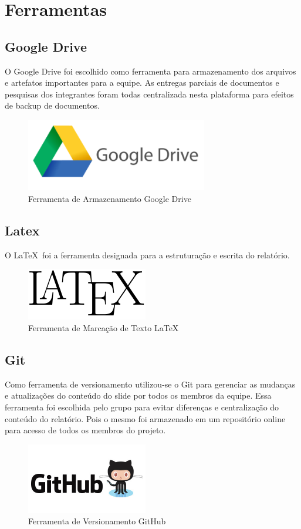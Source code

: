 \section{Ferramentas}

\subsection{Google Drive}
O Google Drive foi escolhido como ferramenta para armazenamento dos arquivos e artefatos importantes para a
equipe. As entregas parciais de documentos e pesquisas dos integrantes foram todas centralizada nesta plataforma
para efeitos de backup de documentos.
\begin{figure}[h]
  \centering
  \includegraphics[width=300px, scale=0.5]{figuras/google_drive-logo}
  \caption{Ferramenta de Armazenamento Google Drive}
  \label{table:google_drive-logo}
\end{figure}
\subsection{Latex}
O \LaTeX\ foi a ferramenta designada para a estruturação e escrita do relatório.
\begin{figure}[h]
  \centering
  \includegraphics[width=200px, scale=0.5]{figuras/latex_logo}
  \caption{Ferramenta de Marcação de Texto LaTeX}
  \label{table:latex_logo}
\end{figure}
\subsection{Git}
Como ferramenta de versionamento utilizou-se o Git para gerenciar as mudanças e atualizações do conteúdo do slide
por todos os membros da equipe. Essa ferramenta foi escolhida pelo grupo para evitar diferenças e centralização do
conteúdo do relatório. Pois o mesmo foi armazenado em um repositório online para acesso de todos os membros do projeto.
\begin{figure}[h]
  \centering
  \includegraphics[width=200px, scale=0.5]{figuras/git}
  \caption{Ferramenta de Versionamento GitHub}
  \label{table:git}
\end{figure}
